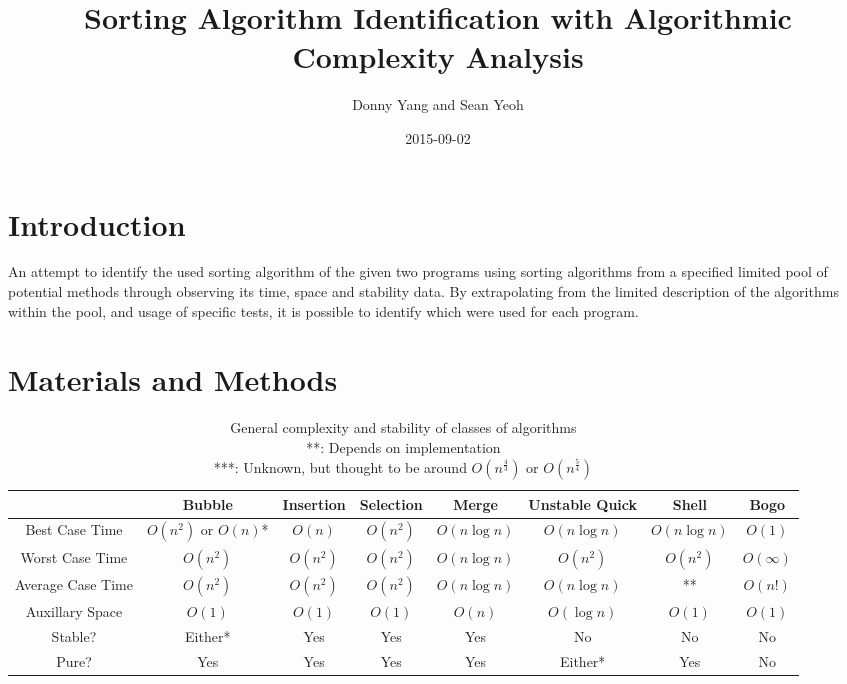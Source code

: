 \documentclass[a4paper]{scrartcl}
\begin{document}
\title{Sorting Algorithm Identification with Algorithmic Complexity Analysis}
\author{Donny Yang and Sean Yeoh}
\date{2015-09-02}
\maketitle

\section{Introduction}
An attempt to identify the used sorting algorithm of the given two programs using sorting algorithms from a specified limited pool of potential methods through observing its time, space and stability data. By extrapolating from the limited description of the algorithms within the pool, and usage of specific tests, it is possible to identify which were used for each program.

\section{Materials and Methods}
\begin{table}
    \centering
    \begin{tabulary}{\linewidth}{c | C | C | C | C | C | C | C}
        & Bubble & Insertion & Selection & Merge & Unstable Quick & Shell & Bogo \\
        \hline
        Best Case Time & \(O(n^2)\) or \(O(n)\)* & \(O(n)\) & \(O(n^2)\) & \(O(n \log{n})\) &  \(O(n \log{n})\) &  \(O(n \log{n})\) & \(O(1)\) \\
        Worst Case Time & \(O(n^2)\) & \(O(n^2)\) & \(O(n^2)\) & \(O(n \log{n})\) & \(O(n^2)\) & \(O(n^2)\) & \(O(\infty)\) \\
        Average Case Time & \(O(n^2)\) & \(O(n^2)\) & \(O(n^2)\) & \(O(n \log{n})\) & \(O(n \log{n})\) & ** & \(O(n!)\) \\
        Auxillary Space & \(O(1)\) & \(O(1)\) & \(O(1)\) & \(O(n)\) & \(O(\log{n})\) & \(O(1)\) & \(O(1)\) \\
        Stable? & Either* & Yes & Yes & Yes & No & No & No \\
        Pure? & Yes & Yes & Yes & Yes & Either* & Yes & No
    \end{tabulary}
    \caption{General complexity and stability of classes of algorithms \\ **: Depends on implementation \\ ***: Unknown, but thought to be around \(O(n^\frac43)\) or \(O(n^\frac54)\)}
    \label{tab:complexity}
\end{table}
\end{document}
